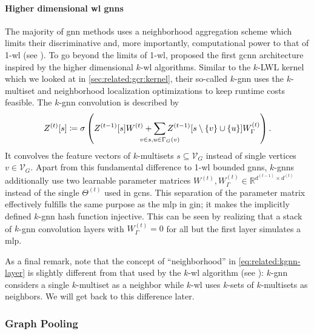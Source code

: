 \paragraph{Higher dimensional \ac{wl} \acp{gnn}}
The majority of \ac{gnn} methods uses a neighborhood aggregation scheme which limits their discriminative and, more importantly, computational power to that of 1-\acs{wl} (see ).
To go beyond the limits of 1-\acs{wl}, \citet{Morris2019} proposed the first \ac{gcnn} architecture inspired by the higher dimensional $k$-\acs{wl} algorithms.
Similar to the $k$-LWL kernel which we looked at in \cref{sec:related:gcr:kernel}, their so-called $k$-\acs{gnn} uses the $k$-multiset and neighborhood localization optimizations to keep runtime costs feasible.
The $k$-\ac{gnn} convolution is described by
\begin{align}
	Z^{(t)}[s] \coloneqq \sigma\left( {Z^{(t-1)}[s]} W^{(t)} + \smashoperator[lr]{\sum_{v \in s, u \in \Gamma_G(v)}} {Z^{(t-1)}[s \setminus \{ v \} \cup \{ u \}]} W_{\Gamma}^{(t)} \right) \text{.} \label{eq:related:kgnn-layer}
\end{align}
It convolves the feature vectors of $k$-multisets $s \subseteq \mathcal{V}_G$ instead of single vertices $v \in \mathcal{V}_G$.
Apart from this fundamental difference to 1-\acs{wl} bounded \acp{gnn}, $k$-\acp{gnn} additionally use two learnable parameter matrices $W^{(t)}, W_{\Gamma}^{(t)} \in \mathbb{R}^{d^{(t-1)} \times d^{(t)}}$ instead of the single $\Theta^{(t)}$ used in \acp{gcn}.
This separation of the parameter matrix effectively fulfills the same purpose as the \ac{mlp} in \ac{gin}; it makes the implicitly defined $k$-\acs{gnn} hash function injective.
This can be seen by realizing that a stack of $k$-\acs{gnn} convolution layers with $W_{\Gamma}^{(t)} = 0$ for all but the first layer simulates a \ac{mlp}.

As a final remark, note that the concept of ``neighborhood'' in \cref{eq:related:kgnn-layer} is slightly different from that used by the $k$-\acs{wl} algorithm (see ):
$k$-\acs{gnn} considers a single $k$-multiset as a neighbor while $k$-\acs{wl} uses $k$-sets of $k$-multisets as neighbors.
We will get back to this difference later.

\subsubsection{Graph Pooling}

